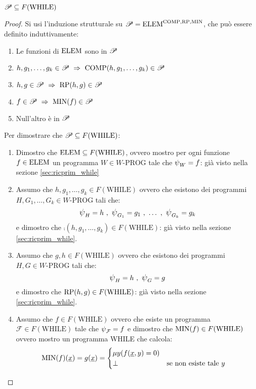 \begin{theorem}\label{th:ricParWhile}
    $\mathscr{P} \subseteq F(\text{WHILE})$
\end{theorem}
\begin{proof}
    Si usi l'induzione strutturale su $\mathscr{P}=\text{ELEM}^{\text{COMP},\text{RP},\text{MIN}}$, che può essere definito
    induttivamente:
    \begin{enumerate}
        \item Le funzioni di $\text{ELEM}$ sono in $\mathscr{P}$
        \item $h,g_1,\dots,g_k\in\ricPar\ \Rightarrow\ \comp(h,g_1,\dots,g_k)\in\ricPar$
        \item $h,g\in\ricPar\ \Rightarrow\ \RP(h,g)\in\ricPar$
        \item $f\in\ricPar\ \Rightarrow\ \MIN(f)\in\ricPar$
        \item Null'altro è in $\mathscr{P}$
    \end{enumerate}
    Per dimostrare che $\mathscr{P} \subseteq F(\text{WHILE})$:
    \begin{enumerate}
    \item Dimostro che $\text{ELEM}\subseteq F(\text{WHILE})$, ovvero mostro per ogni funzione 
    $f\in\text{ELEM}$ un programma $W\in W\text{-PROG}$ tale che $\semanticaWHILE_W=f$: già visto
    nella sezione \ref{sec:ricprim_while}
    \item Assumo che $h,g_1,\dots,g_k\in F(\text{WHILE})$ ovvero che esistono dei programmi
        $H,G_1,\dots,G_k\in W\text{-PROG}$ tali che:
        $$ \semanticaWHILE_H=h \ ,\ \semanticaWHILE_{G_1}=g_1\ ,\ \dots \ ,\
        \semanticaWHILE_{G_k}=g_k $$
        e dimostro che $\comp(h,g_1,\dots,g_k)\in F(\text{WHILE})$: già visto nella sezione
        \ref{sec:ricprim_while}.
    \begin{minipage}{.9\textwidth}
        \begin{algorithm}[H]

        \end{algorithm}
    \end{minipage}
    \item Assumo che $g,h\in F(\text{WHILE})$ ovvero che esistono dei programmi
        $H,G\in W\text{-PROG}$ tali che:
        $$ \semanticaWHILE_H=h \ ,\ \semanticaWHILE_{G}=g $$ 
        e dimostro che 
        $\text{RP}(h,g)\in F(\text{WHILE})$: già visto nella sezione \ref{sec:ricprim_while}.
    \item Assumo che $f\in F(\text{WHILE})$ ovvero che esiste un programma $\mathcal{F}\in
        F(\text{WHILE})$ tale che $\semanticaWHILE_\mathcal{F}=f$
        e dimostro che $\text{MIN}(f)\in F(\text{WHILE})$ ovvero mostro un programma WHILE
        che calcola:
        $$ \begin{aligned}
            \text{MIN}(f)(\text{\underline{$x$}}) = g(\text{\underline{$x$}}) &=
            \begin{cases}
                \mu y(f(\text{\underline{$x$}},y)=0)\\
                \perp & \text{se non esiste tale $y$}
            \end{cases}
        \end{aligned}$$
        \vspace{.7em}


\end{enumerate}
\end{proof}
